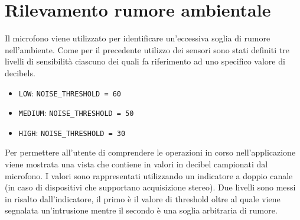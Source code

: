 \section{Rilevamento rumore ambientale}
Il microfono viene utilizzato per identificare un'eccessiva soglia di rumore nell'ambiente. Come per il precedente utilizzo dei sensori sono stati definiti tre livelli di sensibilità ciascuno dei quali fa riferimento ad uno specifico valore di decibels.

\begin{itemize}
	\item \texttt{LOW}: \texttt{NOISE\_THRESHOLD = 60}
	\item \texttt{MEDIUM}:  \texttt{NOISE\_THRESHOLD = 50}
	\item \texttt{HIGH}:  \texttt{NOISE\_THRESHOLD = 30}
\end{itemize}

Per permettere all'utente di comprendere le operazioni in corso nell'applicazione viene mostrata una vista che contiene in valori in decibel campionati dal microfono. I valori sono rappresentati utilizzando un indicatore a doppio canale (in caso di dispositivi che supportano acquisizione stereo). Due livelli sono messi in risalto dall'indicatore, il primo è il valore di threshold oltre al quale viene segnalata un'intrusione mentre il secondo è una soglia arbitraria di rumore.

